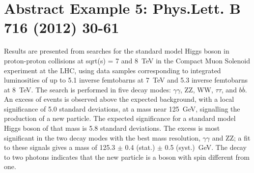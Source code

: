 \documentclass{article}
\begin{document}
\section{Abstract Example 5: Phys.Lett. B 716 (2012) 30-61}
Results are presented from searches for the standard model Higgs boson in
proton-proton collisions at sqrt(s) = 7 and 8~TeV in the Compact Muon
Solenoid experiment at the LHC, using data samples corresponding to 
integrated luminosities of up to 5.1 inverse femtobarns at 7~TeV and 
5.3 inverse femtobarns at 8~TeV. The search is performed in five decay 
modes: $\gamma\gamma$, ZZ, WW, $\tau\tau$, and $b\overline{b}$. An excess of events 
is observed above the expected background, with a local significance of
5.0 standard deviations, at a mass near 125~GeV, signalling the production
of a new particle. The expected significance for a standard model Higgs 
boson of that mass is 5.8 standard deviations. The excess is most 
significant in the two decay modes with the best mass resolution, 
$\gamma\gamma$ and ZZ; a fit to these signals gives a mass of 
125.3 $\pm$ 0.4 (stat.) $\pm$ 0.5 (syst.)~GeV. The decay to two photons 
indicates that the new particle is a boson with spin different from one.
\end{document}
